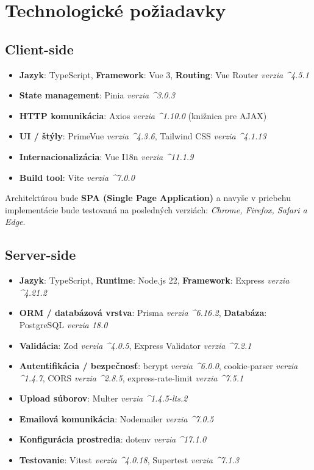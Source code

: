 \section{Technologické požiadavky}

\subsection{Client-side}
\begin{itemize}[itemsep=2pt]
    \item \textbf{Jazyk}: TypeScript, \textbf{Framework}: Vue 3, \textbf{Routing}: Vue Router \textit{verzia \textasciicircum 4.5.1}
    \item \textbf{State management}: Pinia \textit{verzia \textasciicircum 3.0.3}
    \item \textbf{HTTP komunikácia}: Axios \textit{verzia \textasciicircum 1.10.0} (knižnica pre AJAX)
    \item \textbf{UI / štýly}: PrimeVue \textit{verzia \textasciicircum 4.3.6}, Tailwind CSS \textit{verzia \textasciicircum 4.1.13}
    \item \textbf{Internacionalizácia}: Vue I18n \textit{verzia \textasciicircum 11.1.9}
    \item \textbf{Build tool}: Vite \textit{verzia \textasciicircum 7.0.0}
\end{itemize}
Architektúrou bude \textbf{SPA (Single Page Application)} a navyše v priebehu implementácie bude testovaná na posledných verziách: \textit{Chrome, Firefox, Safari a Edge}.

\subsection{Server-side}
\begin{itemize}[itemsep=2pt]
    \item \textbf{Jazyk}: TypeScript, \textbf{Runtime}: Node.js 22, \textbf{Framework}: Express \textit{verzia \textasciicircum 4.21.2}
    \item \textbf{ORM / databázová vrstva}: Prisma \textit{verzia \textasciicircum 6.16.2}, \textbf{Databáza}: PostgreSQL \textit{verzia 18.0}
    \item \textbf{Validácia}: Zod \textit{verzia \textasciicircum 4.0.5}, Express Validator \textit{verzia \textasciicircum 7.2.1}
    \item \textbf{Autentifikácia / bezpečnosť}: bcrypt \textit{verzia \textasciicircum 6.0.0}, cookie-parser \textit{verzia \textasciicircum 1.4.7}, CORS \textit{verzia \textasciicircum 2.8.5}, express-rate-limit \textit{verzia \textasciicircum 7.5.1}
    \item \textbf{Upload súborov}: Multer \textit{verzia \textasciicircum 1.4.5-lts.2}
    \item \textbf{Emailová komunikácia}: Nodemailer \textit{verzia \textasciicircum 7.0.5}
    \item \textbf{Konfigurácia prostredia}: dotenv \textit{verzia \textasciicircum 17.1.0}
    \item \textbf{Testovanie}: Vitest \textit{verzia \textasciicircum 4.0.18}, Supertest \textit{verzia \textasciicircum 7.1.3}
\end{itemize}

